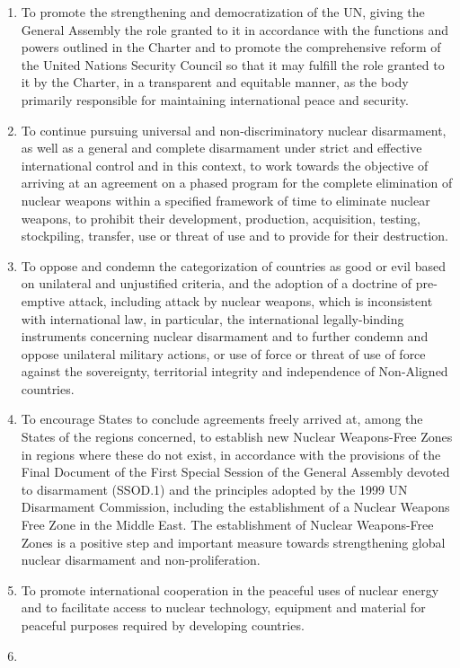 \documentclass[
  openany]{book}
\begin{document}
\begin{enumerate}
\item
  To promote the strengthening and democratization of the UN, giving the General Assembly the role granted to it in accordance with the functions and powers outlined in the Charter and to promote the comprehensive reform of the United Nations Security Council so that it may fulfill the role granted to it by the Charter, in a transparent and equitable manner, as the body primarily responsible for maintaining international peace and security.
\item
  To continue pursuing universal and non-discriminatory nuclear disarmament, as well as a general and complete disarmament under strict and effective international control and in this context, to work towards the objective of arriving at an agreement on a phased program for the complete elimination of nuclear weapons within a specified framework of time to eliminate nuclear weapons, to prohibit their development, production, acquisition, testing, stockpiling, transfer, use or threat of use and to provide for their destruction.
\item
  To oppose and condemn the categorization of countries as good or evil based on unilateral and unjustified criteria, and the adoption of a doctrine of pre-emptive attack, including attack by nuclear weapons, which is inconsistent with international law, in particular, the international legally-binding instruments concerning nuclear disarmament and to further condemn and oppose unilateral military actions, or use of force or threat of use of force against the sovereignty, territorial integrity and independence of Non-Aligned countries.
\item
  To encourage States to conclude agreements freely arrived at, among the States of the regions concerned, to establish new Nuclear Weapons-Free Zones in regions where these do not exist, in accordance with the provisions of the Final Document of the First Special Session of the General Assembly devoted to disarmament (SSOD.1) and the principles adopted by the 1999 UN Disarmament Commission, including the establishment of a Nuclear Weapons Free Zone in the Middle East. The establishment of Nuclear Weapons-Free Zones is a positive step and important measure towards strengthening global nuclear disarmament and non-proliferation.
\item
  To promote international cooperation in the peaceful uses of nuclear energy and to facilitate access to nuclear technology, equipment and material for peaceful purposes required by developing countries.
\item

\end{enumerate}
\end{document}
